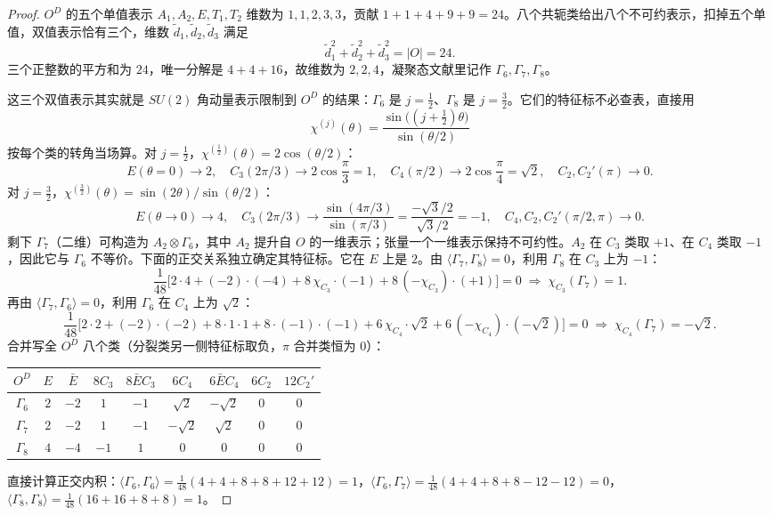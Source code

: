 \begin{proof}
$O^D$ 的五个单值表示 $A_1,A_2,E,T_1,T_2$ 维数为 $1,1,2,3,3$，贡献 $1+1+4+9+9=24$。八个共轭类给出八个不可约表示，扣掉五个单值，双值表示恰有三个，维数 $\tilde d_1,\tilde d_2,\tilde d_3$ 满足
\[
\tilde d_1^2+\tilde d_2^2+\tilde d_3^2=|O|=24.
\]
三个正整数的平方和为 $24$，唯一分解是 $4+4+16$，故维数为 $2,2,4$，凝聚态文献里记作 $\Gamma_6,\Gamma_7,\Gamma_8$。

这三个双值表示其实就是 $SU(2)$ 角动量表示限制到 $O^D$ 的结果：$\Gamma_6$ 是 $j=\tfrac12$、$\Gamma_8$ 是 $j=\tfrac32$。它们的特征标不必查表，直接用 
\[
\chi^{(j)}(\theta)=\frac{\sin\bigl((j+\tfrac12)\theta\bigr)}{\sin(\theta/2)}
\]
按每个类的转角当场算。对 $j=\tfrac12$，$\chi^{(\frac12)}(\theta)=2\cos(\theta/2)$：
\[
E(\theta=0)\to2,\quad C_3(2\pi/3)\to2\cos\frac\pi3=1,\quad
C_4(\pi/2)\to2\cos\frac\pi4=\sqrt2,\quad C_2,C_2'(\pi)\to0.
\]
对 $j=\tfrac32$，$\chi^{(\frac32)}(\theta)=\sin(2\theta)/\sin(\theta/2)$：
\[
E(\theta\to0)\to4,\quad
C_3(2\pi/3)\to\frac{\sin(4\pi/3)}{\sin(\pi/3)}=\frac{-\sqrt3/2}{\sqrt3/2}=-1,\quad
C_4,C_2,C_2'(\pi/2,\pi)\to0.
\]
剩下 $\Gamma_7$（二维）可构造为 $A_2\otimes\Gamma_6$，其中 $A_2$ 提升自 $O$ 的一维表示；张量一个一维表示保持不可约性。$A_2$ 在 $C_3$ 类取 $+1$、在 $C_4$ 类取 $-1$，因此它与 $\Gamma_6$ 不等价。下面的正交关系独立确定其特征标。它在 $E$ 上是 $2$。由 $\langle\Gamma_7,\Gamma_8\rangle=0$，利用 $\Gamma_8$ 在 $C_3$ 上为 $-1$：
\[
\frac1{48}\bigl[2\cdot4+(-2)\cdot(-4)+8\,\chi_{C_3}\cdot(-1)+8\,(-\chi_{C_3})\cdot(+1)\bigr]=0
\;\Longrightarrow\;
\chi_{C_3}(\Gamma_7)=1.
\]
再由 $\langle\Gamma_7,\Gamma_6\rangle=0$，利用 $\Gamma_6$ 在 $C_4$ 上为 $\sqrt2$：
\[
\frac1{48}\bigl[2\cdot2+(-2)\cdot(-2)+8\cdot1\cdot1+8\cdot(-1)\cdot(-1)
+6\,\chi_{C_4}\cdot\sqrt2+6\,(-\chi_{C_4})\cdot(-\sqrt2)\bigr]=0
\;\Longrightarrow\;
\chi_{C_4}(\Gamma_7)=-\sqrt2.
\]
合并写全 $O^D$ 八个类（分裂类另一侧特征标取负，$\pi$ 合并类恒为 $0$）：

\begin{center}
\begin{tabular}{c|cccccccc}
\toprule
$O^D$ & $E$ & $\bar E$ & $8C_3$ & $8\bar EC_3$ & $6C_4$ & $6\bar EC_4$ & $6C_2$ & $12C_2'$ \\
\midrule
$\Gamma_6$ & $2$ & $-2$ & $1$ & $-1$ & $\sqrt2$ & $-\sqrt2$ & $0$ & $0$ \\
$\Gamma_7$ & $2$ & $-2$ & $1$ & $-1$ & $-\sqrt2$ & $\sqrt2$ & $0$ & $0$ \\
$\Gamma_8$ & $4$ & $-4$ & $-1$ & $1$ & $0$ & $0$ & $0$ & $0$ \\
\bottomrule
\end{tabular}
\end{center}

直接计算正交内积：$\langle\Gamma_6,\Gamma_6\rangle=\frac1{48}(4+4+8+8+12+12)=1$，$\langle\Gamma_6,\Gamma_7\rangle=\frac1{48}(4+4+8+8-12-12)=0$，$\langle\Gamma_8,\Gamma_8\rangle=\frac1{48}(16+16+8+8)=1$。
\end{proof}



